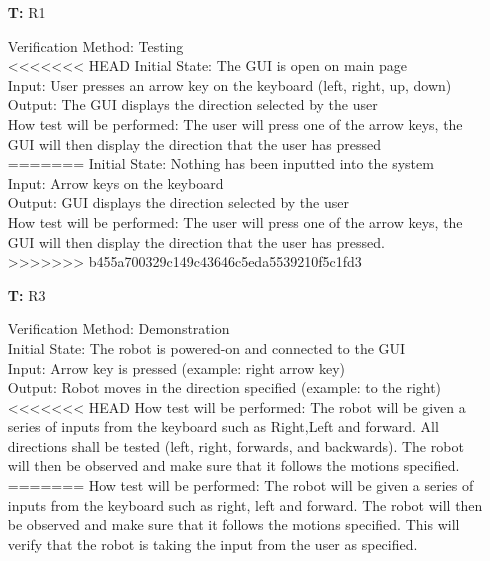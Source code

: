 \documentclass[12pt, titlepage]{article}
\newcounter{tnum} %
\begin{document}
\noindent \begin{itemize}
\item[\textbf{T\refstepcounter{tnum}\thetnum:}]{R1\\}

Verification Method: Testing	\\	
<<<<<<< HEAD
Initial State: The GUI is open on main page\\
Input: User presses an arrow key on the keyboard (left, right, up, down) \\ 
Output: The GUI displays the direction selected by the user \\ 
How test will be performed: The user will press one of the arrow keys, the GUI will then display the direction that the user has pressed\\
=======
Initial State: Nothing has been inputted into the system\\
Input: Arrow keys on the keyboard \\ 
Output: GUI displays the direction selected by the user \\ 
How test will be performed: The user will press one of the arrow keys, the GUI will then display the direction that the user has pressed.\\
>>>>>>> b455a700329c149c43646c5eda5539210f5c1fd3

\item[\textbf{T\refstepcounter{tnum}\thetnum:}]{R3\\}

Verification Method: Demonstration	\\	
Initial State: The robot is powered-on and connected to the GUI \\
Input: Arrow key is pressed (example: right arrow key) \\ 
Output: Robot moves in the direction specified (example: to the right) \\ 
<<<<<<< HEAD
How test will be performed: The robot will be given a series of inputs from the keyboard such as Right,Left and forward. All directions shall be tested (left, right, forwards, and backwards). The robot will then be observed and make sure that it follows the motions specified. \\
=======
How test will be performed: The robot will be given a series of inputs from the keyboard such as right, left and forward. The robot will then be observed and make sure that it follows the motions specified. This will verify that the robot is taking the input from the user as specified. \\
	

\end{itemize}
\end{document}
